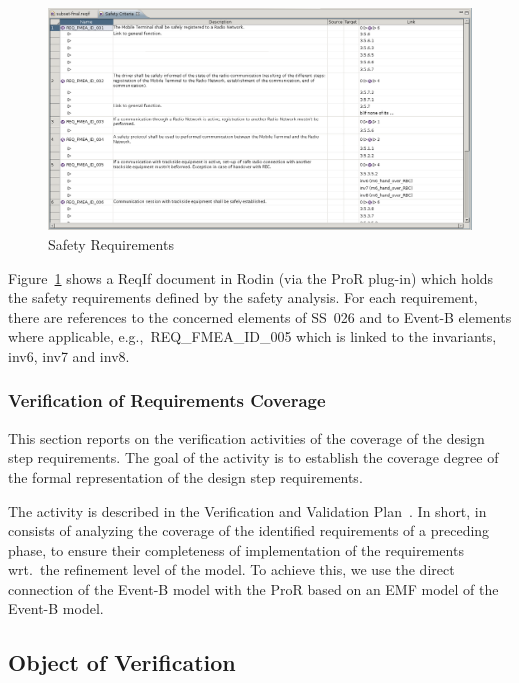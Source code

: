 \begin{figure}[ht]
  \centering
  \includegraphics[width=1\textwidth]{figures/ProRSafetyReq}
  \caption{Safety Requirements}
  \label{fig:pror-safety-req}
\end{figure}

Figure~\ref{fig:pror-safety-req} shows a ReqIf document in Rodin (via the ProR
plug-in) which holds the safety requirements defined by the safety analysis. For
each requirement, there are references to the concerned elements of SS~026 and
to Event-B elements where applicable, e.g.,\ {\sf REQ\_FMEA\_ID\_005} which is
linked to the invariants, {\sf inv6}, {\sf inv7} and {\sf inv8}.


\subsubsection{Verification of Requirements Coverage}
\label{sec:verif-requ-cover}

This section reports on the verification activities of the coverage of the
design step requirements. The goal of the activity is to establish the coverage
degree of the formal representation of the design step requirements.

The activity is described in the Verification and Validation
Plan~\cite{vnvplan}.  In short, in consists of analyzing the coverage of the
identified requirements of a preceding phase, to ensure their completeness of
implementation of the requirements wrt.\ the refinement level of the model. To
achieve this, we use the direct connection of the Event-B model with the ProR
based on an EMF model of the Event-B model.


\subsection{Object of Verification}
\label{sec:object-verification}

